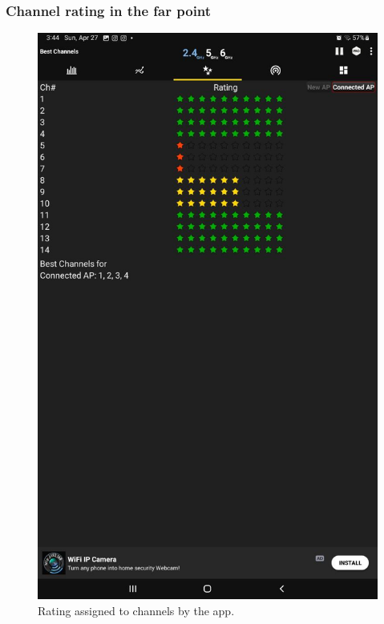 \documentclass{article}
\begin{document}
\subsubsection{Channel rating in the far point} 
\begin{figure}[H]
    \centering
    \includegraphics[width=1\linewidth]{images/rating_far.jpg}
    \caption{Rating assigned to channels by the app.}
    \label{fig:rating-far}
\end{figure}
\end{document}
